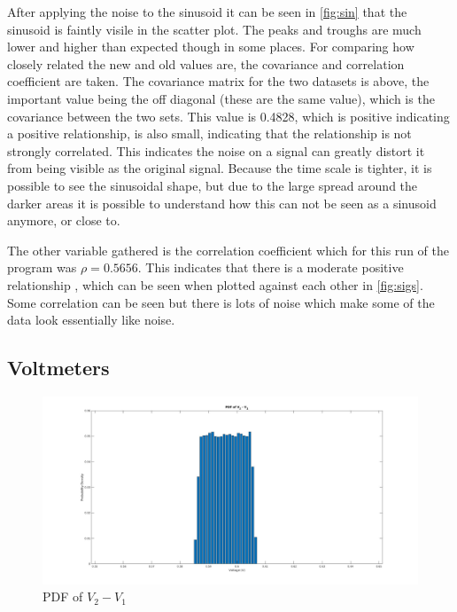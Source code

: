 \documentclass[a4paper, 12pt]{article}
\begin{document}
            After applying the noise to the sinusoid it can be seen in \cref{fig:sin} that the sinusoid is faintly visile in the scatter plot. The peaks and troughs are much lower and higher than expected though in some places. For comparing how closely related the new and old values are, the covariance and correlation coefficient are taken. The covariance matrix for the two datasets is above, the important value being the off diagonal (these are the same value), which is the covariance between the two sets. This value is 0.4828, which is positive indicating a positive relationship, is also small, indicating that the relationship is not strongly correlated. This indicates the noise on a signal can greatly distort it from being visible as the original signal. Because the time scale is tighter, it is possible to see the sinusoidal shape, but due to the large spread around the darker areas it is possible to understand how this can not be seen as a sinusoid anymore, or close to. 
            \par
            The other variable gathered is the correlation coefficient which for this run of the program was $\rho = 0.5656$. This indicates that there is a moderate positive relationship \cite{rumsey_2020}, which can be seen when plotted against each other in \cref{fig:sigs}. Some correlation can be seen but there is lots of noise which make some of the data look essentially like noise. 

        \subsection{Voltmeters}
            \begin{figure}[!t]
                \centering
                \includegraphics[width=\textwidth]{V3.jpg}
                \caption{PDF of $V_2 - V_1$}
                \label{fig:v3}
            \end{figure}
\end{document}
